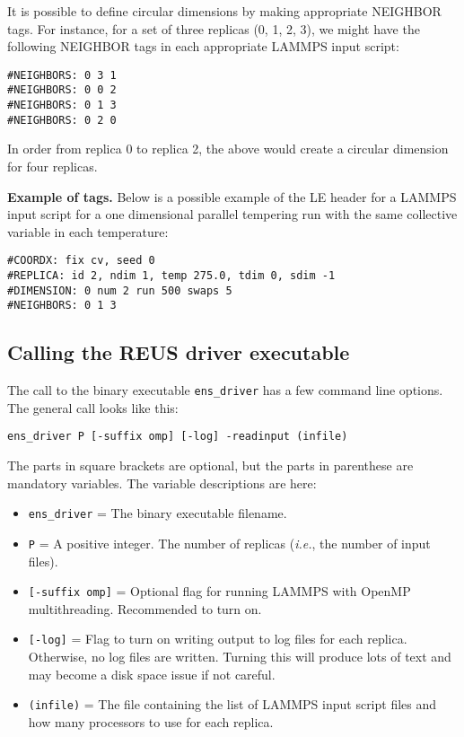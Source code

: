 \documentclass[10pt]{article}
\begin{document}
It is possible to define circular dimensions by making appropriate NEIGHBOR tags. For
instance, for a set of three replicas (0, 1, 2, 3), we might have the following NEIGHBOR tags
in each appropriate LAMMPS input script:
\begin{verbatim}
#NEIGHBORS: 0 3 1
#NEIGHBORS: 0 0 2
#NEIGHBORS: 0 1 3
#NEIGHBORS: 0 2 0
\end{verbatim}
In order from replica 0 to replica 2, the above would create a circular dimension for four
replicas.


\textbf{Example of tags.}
Below is a possible example of the LE header for a LAMMPS input script for a one dimensional
parallel tempering run with the same collective variable in each temperature:
\begin{verbatim}
#COORDX: fix cv, seed 0
#REPLICA: id 2, ndim 1, temp 275.0, tdim 0, sdim -1
#DIMENSION: 0 num 2 run 500 swaps 5
#NEIGHBORS: 0 1 3
\end{verbatim}

\subsection{Calling the REUS driver executable}\label{ssec:running_REUS}

The call to the binary executable \texttt{ens\_driver} has a few command line options.
The general call looks like this:
\begin{verbatim}
ens_driver P [-suffix omp] [-log] -readinput (infile)
\end{verbatim}
The parts in square brackets are optional, but the parts in parenthese are mandatory variables. 
The variable descriptions are here:
\begin{itemize}
\item	\texttt{ens\_driver} = The binary executable filename.
\item	\texttt{P} = A positive integer. 
		The number of replicas ({\em i.e.}, the number of input files).
\item	\texttt{[-suffix omp]} = Optional flag for running LAMMPS with OpenMP multithreading.
		Recommended to turn on.
\item	\texttt{[-log]} = Flag to turn on writing output to log files for each replica. Otherwise,
		no log files are written. Turning this will produce lots of text and may become a 
		disk space issue if not careful.
\item	\texttt{(infile)} = The file containing the list of LAMMPS input script files and how many
		processors to use for each replica.
\end{itemize}
\end{document}
